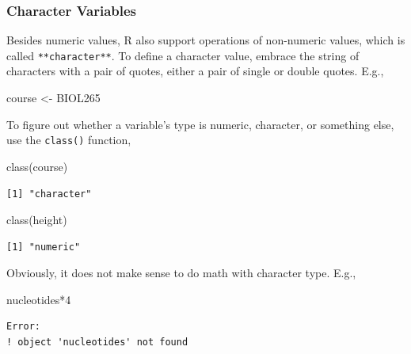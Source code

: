 \documentclass[
  letterpaper,
]{book}
\newenvironment{Shaded}{\begin{snugshade}}{\end{snugshade}}
\newcommand{\DecValTok}[1]{\textcolor[rgb]{0.68,0.00,0.00}{#1}}
\newcommand{\FunctionTok}[1]{\textcolor[rgb]{0.28,0.35,0.67}{#1}}
\newcommand{\NormalTok}[1]{\textcolor[rgb]{0.00,0.23,0.31}{#1}}
\newcommand{\OtherTok}[1]{\textcolor[rgb]{0.00,0.23,0.31}{#1}}
\newcommand{\SpecialCharTok}[1]{\textcolor[rgb]{0.37,0.37,0.37}{#1}}
\newcommand{\StringTok}[1]{\textcolor[rgb]{0.13,0.47,0.30}{#1}}
\begin{document}
\subsubsection*{Character Variables}\label{character-variables}

Besides numeric values, R also support operations of non-numeric values,
which is called \texttt{**character**}. To define a character value,
embrace the string of characters with a pair of quotes, either a pair of
single or double quotes. E.g.,

\begin{Shaded}
\begin{Highlighting}[]
\NormalTok{course }\OtherTok{\textless{}{-}} \StringTok{\textquotesingle{}BIOL265\textquotesingle{}}
\end{Highlighting}
\end{Shaded}

To figure out whether a variable's type is numeric, character, or
something else, use the \texttt{class()} function,

\begin{Shaded}
\begin{Highlighting}[]
\FunctionTok{class}\NormalTok{(course)}
\end{Highlighting}
\end{Shaded}

\begin{verbatim}
[1] "character"
\end{verbatim}

\begin{Shaded}
\begin{Highlighting}[]
\FunctionTok{class}\NormalTok{(height)}
\end{Highlighting}
\end{Shaded}

\begin{verbatim}
[1] "numeric"
\end{verbatim}

Obviously, it does not make sense to do math with character type. E.g.,

\begin{Shaded}
\begin{Highlighting}[]
\NormalTok{nucleotides}\SpecialCharTok{*}\DecValTok{4}
\end{Highlighting}
\end{Shaded}

\begin{verbatim}
Error:
! object 'nucleotides' not found
\end{verbatim}
\end{document}
